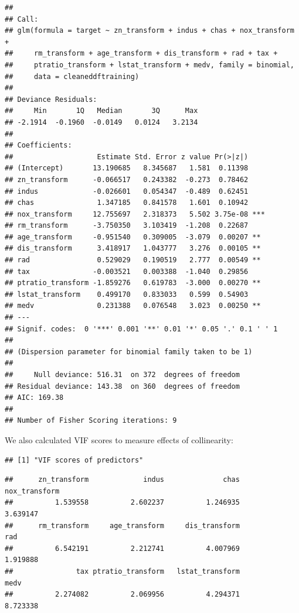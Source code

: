\documentclass[
]{article}
\begin{document}
\begin{verbatim}
## 
## Call:
## glm(formula = target ~ zn_transform + indus + chas + nox_transform + 
##     rm_transform + age_transform + dis_transform + rad + tax + 
##     ptratio_transform + lstat_transform + medv, family = binomial, 
##     data = cleaneddftraining)
## 
## Deviance Residuals: 
##     Min       1Q   Median       3Q      Max  
## -2.1914  -0.1960  -0.0149   0.0124   3.2134  
## 
## Coefficients:
##                    Estimate Std. Error z value Pr(>|z|)    
## (Intercept)       13.190685   8.345687   1.581  0.11398    
## zn_transform      -0.066517   0.243382  -0.273  0.78462    
## indus             -0.026601   0.054347  -0.489  0.62451    
## chas               1.347185   0.841578   1.601  0.10942    
## nox_transform     12.755697   2.318373   5.502 3.75e-08 ***
## rm_transform      -3.750350   3.103419  -1.208  0.22687    
## age_transform     -0.951540   0.309005  -3.079  0.00207 ** 
## dis_transform      3.418917   1.043777   3.276  0.00105 ** 
## rad                0.529029   0.190519   2.777  0.00549 ** 
## tax               -0.003521   0.003388  -1.040  0.29856    
## ptratio_transform -1.859276   0.619783  -3.000  0.00270 ** 
## lstat_transform    0.499170   0.833033   0.599  0.54903    
## medv               0.231388   0.076548   3.023  0.00250 ** 
## ---
## Signif. codes:  0 '***' 0.001 '**' 0.01 '*' 0.05 '.' 0.1 ' ' 1
## 
## (Dispersion parameter for binomial family taken to be 1)
## 
##     Null deviance: 516.31  on 372  degrees of freedom
## Residual deviance: 143.38  on 360  degrees of freedom
## AIC: 169.38
## 
## Number of Fisher Scoring iterations: 9
\end{verbatim}

We also calculated VIF scores to measure effects of collinearity:

\begin{verbatim}
## [1] "VIF scores of predictors"
\end{verbatim}

\begin{verbatim}
##      zn_transform             indus              chas     nox_transform 
##          1.539558          2.602237          1.246935          3.639147 
##      rm_transform     age_transform     dis_transform               rad 
##          6.542191          2.212741          4.007969          1.919888 
##               tax ptratio_transform   lstat_transform              medv 
##          2.274082          2.069956          4.294371          8.723338
\end{verbatim}
\end{document}
